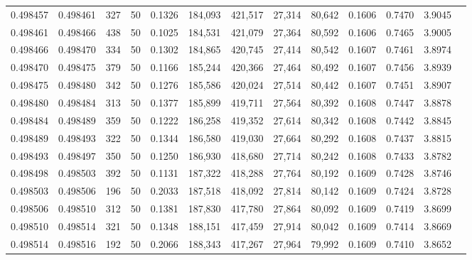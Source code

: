 \begin{tabular}{rrrrrrrrrrrrr}
0.498457 & 0.498461 & 327 &  50 &                                     0.1326 & 184,093 & 421,517 &  27,314 &  80,642 & 0.1606 & 0.7470 & 3.9045 \\
0.498461 & 0.498466 & 438 &  50 &                                     0.1025 & 184,531 & 421,079 &  27,364 &  80,592 & 0.1606 & 0.7465 & 3.9005 \\
0.498466 & 0.498470 & 334 &  50 &                                     0.1302 & 184,865 & 420,745 &  27,414 &  80,542 & 0.1607 & 0.7461 & 3.8974 \\
0.498470 & 0.498475 & 379 &  50 &                                     0.1166 & 185,244 & 420,366 &  27,464 &  80,492 & 0.1607 & 0.7456 & 3.8939 \\
0.498475 & 0.498480 & 342 &  50 &                                     0.1276 & 185,586 & 420,024 &  27,514 &  80,442 & 0.1607 & 0.7451 & 3.8907 \\
0.498480 & 0.498484 & 313 &  50 &                                     0.1377 & 185,899 & 419,711 &  27,564 &  80,392 & 0.1608 & 0.7447 & 3.8878 \\
0.498484 & 0.498489 & 359 &  50 &                                     0.1222 & 186,258 & 419,352 &  27,614 &  80,342 & 0.1608 & 0.7442 & 3.8845 \\
0.498489 & 0.498493 & 322 &  50 &                                     0.1344 & 186,580 & 419,030 &  27,664 &  80,292 & 0.1608 & 0.7437 & 3.8815 \\
0.498493 & 0.498497 & 350 &  50 &                                     0.1250 & 186,930 & 418,680 &  27,714 &  80,242 & 0.1608 & 0.7433 & 3.8782 \\
0.498498 & 0.498503 & 392 &  50 &                                     0.1131 & 187,322 & 418,288 &  27,764 &  80,192 & 0.1609 & 0.7428 & 3.8746 \\
0.498503 & 0.498506 & 196 &  50 &                                     0.2033 & 187,518 & 418,092 &  27,814 &  80,142 & 0.1609 & 0.7424 & 3.8728 \\
0.498506 & 0.498510 & 312 &  50 &                                     0.1381 & 187,830 & 417,780 &  27,864 &  80,092 & 0.1609 & 0.7419 & 3.8699 \\
0.498510 & 0.498514 & 321 &  50 &                                     0.1348 & 188,151 & 417,459 &  27,914 &  80,042 & 0.1609 & 0.7414 & 3.8669 \\
0.498514 & 0.498516 & 192 &  50 &                                     0.2066 & 188,343 & 417,267 &  27,964 &  79,992 & 0.1609 & 0.7410 & 3.8652 \\

\end{tabular}
